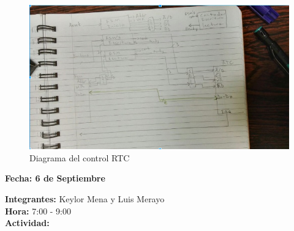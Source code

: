 \documentclass[12pt,a4paper]{report}
\begin{document}
\begin{figure}[hbtp]
	\centering
	\includegraphics[width=16cm]{Img/ControlRTC1.jpg}
	\caption{Diagrama del control RTC}
	\label{fig:ControlRTC1}
\end{figure}



\newpage
\begin{flushright}
	\begin{large}
		\textbf{Fecha: 6 de Septiembre}\\[5ex]
	\end{large}
\end{flushright}

\noindent \textbf{Integrantes:} Keylor Mena y Luis Merayo \\[1ex]
\textbf{Hora:} 7:00 - 9:00 \\[1ex]
\textbf{Actividad:} \\[2ex]
\end{document}
